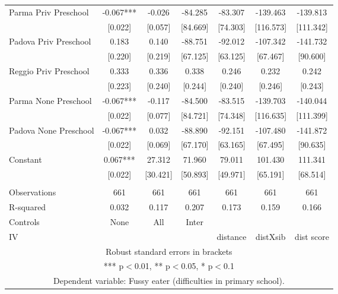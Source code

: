 \begin{tabular}{lcccccc}
Parma Priv Preschool & -0.067*** & -0.026 & -84.285 & -83.307 & -139.463 & -139.813 \\
 & [0.022] & [0.057] & [84.669] & [74.303] & [116.573] & [111.342] \\
Padova Priv Preschool & 0.183 & 0.140 & -88.751 & -92.012 & -107.342 & -141.732 \\
 & [0.220] & [0.219] & [67.125] & [63.125] & [67.467] & [90.600] \\
Reggio Priv Preschool & 0.333 & 0.336 & 0.338 & 0.246 & 0.232 & 0.242 \\
 & [0.223] & [0.240] & [0.244] & [0.240] & [0.246] & [0.243] \\
Parma None Preschool & -0.067*** & -0.117 & -84.500 & -83.515 & -139.703 & -140.044 \\
 & [0.022] & [0.077] & [84.721] & [74.348] & [116.635] & [111.399] \\
Padova None Preschool & -0.067*** & 0.032 & -88.890 & -92.151 & -107.480 & -141.872 \\
 & [0.022] & [0.069] & [67.170] & [63.165] & [67.495] & [90.635] \\
Constant & 0.067*** & 27.312 & 71.960 & 79.011 & 101.430 & 111.341 \\
 & [0.022] & [30.421] & [50.893] & [49.971] & [65.191] & [68.514] \\
 &  &  &  &  &  &  \\
Observations & 661 & 661 & 661 & 661 & 661 & 661 \\
R-squared & 0.032 & 0.117 & 0.207 & 0.173 & 0.159 & 0.166 \\
Controls & None & All & Inter &  &  &  \\
 IV &  &  &  & distance & distXsib & dist score \\ \hline
\multicolumn{7}{c}{ Robust standard errors in brackets} \\
\multicolumn{7}{c}{ *** p$<$0.01, ** p$<$0.05, * p$<$0.1} \\
\multicolumn{7}{c}{ Dependent variable: Fussy eater (difficulties in primary school).} \\
\end{tabular}
